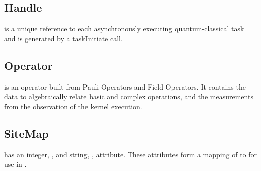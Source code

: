 \subsection{\textbf{Handle}}\label{subsec:Handle}
 is a unique reference to each asynchronously executing quantum-classical task and is generated by a taskInitiate call. \\

\subsection{\textbf{Operator}}\label{subsec:Operator}
 is an operator built from Pauli Operators and Field Operators.
It contains the data to algebraically relate basic and complex operations, 
and the measurements from the observation of the kernel execution.\\



\subsection{\textbf{SiteMap}}\label{subsec:Sitemap}
 has an integer, , and string, , attribute. These attributes form a mapping of  to  for use in \Clang.

